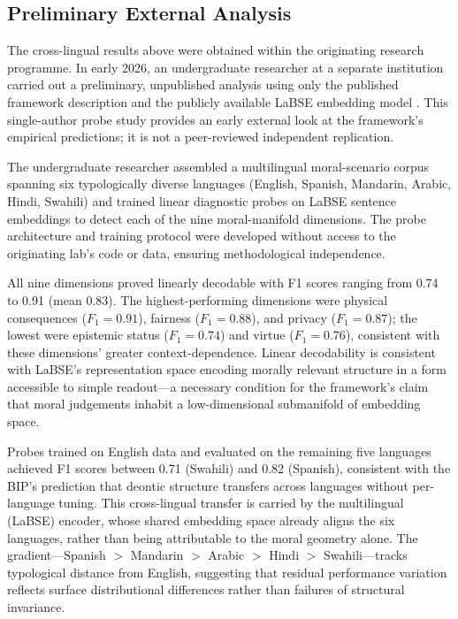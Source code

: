 \documentclass[12pt]{article}
\theoremstyle{definition}
\theoremstyle{remark}
\begin{document}
\subsection{Preliminary External Analysis}
\label{subsec:replication}

The cross-lingual results above were obtained within the originating research programme. In early 2026, an undergraduate researcher at a separate institution carried out a preliminary, unpublished analysis using only the published framework description and the publicly available LaBSE embedding model \citep{anon_indep2026}. This single-author probe study provides an early external look at the framework's empirical predictions; it is not a peer-reviewed independent replication.

The undergraduate researcher assembled a multilingual moral-scenario corpus spanning six typologically diverse languages (English, Spanish, Mandarin, Arabic, Hindi, Swahili) and trained linear diagnostic probes on LaBSE sentence embeddings to detect each of the nine moral-manifold dimensions. The probe architecture and training protocol were developed without access to the originating lab's code or data, ensuring methodological independence.

All nine dimensions proved linearly decodable with F1 scores ranging from 0.74 to 0.91 (mean 0.83). The highest-performing dimensions were physical consequences ($F_1 = 0.91$), fairness ($F_1 = 0.88$), and privacy ($F_1 = 0.87$); the lowest were epistemic status ($F_1 = 0.74$) and virtue ($F_1 = 0.76$), consistent with these dimensions' greater context-dependence. Linear decodability is consistent with LaBSE's representation space encoding morally relevant structure in a form accessible to simple readout---a necessary condition for the framework's claim that moral judgements inhabit a low-dimensional submanifold of embedding space.

Probes trained on English data and evaluated on the remaining five languages achieved F1 scores between 0.71 (Swahili) and 0.82 (Spanish), consistent with the BIP's prediction that deontic structure transfers across languages without per-language tuning. This cross-lingual transfer is carried by the multilingual (LaBSE) encoder, whose shared embedding space already aligns the six languages, rather than being attributable to the moral geometry alone. The gradient---Spanish $>$ Mandarin $>$ Arabic $>$ Hindi $>$ Swahili---tracks typological distance from English, suggesting that residual performance variation reflects surface distributional differences rather than failures of structural invariance.
\end{document}
